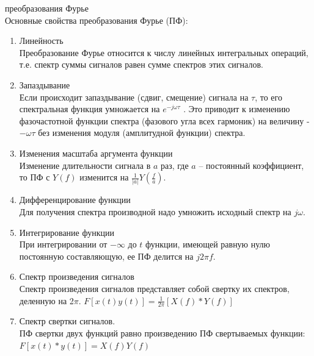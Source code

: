 \documentclass[a4paper,12pt]{article}
\begin{document}
{ преобразования Фурье}
\\Основные свойства преобразования Фурье (ПФ):
\begin{enumerate}
	\item Линейность\\
    Преобразование Фурье относится к числу линейных интегральных операций, т.е. спектр суммы сигналов равен сумме спектров этих сигналов.
    \item Запаздывание\\
   Если происходит запаздывание (сдвиг, смещение) сигнала на $\tau$, то его спектральная функция умножается на $e^{-j\omega \tau}$ . Это приводит к изменению фазочастотной функции спектра (фазового угла всех гармоник) на величину - $-\omega \tau$ без изменения модуля (амплитудной функции) спектра.
    \item Изменения масштаба аргумента функции\\
   Изменение длительности сигнала в $a$ раз, где $a$ -- постоянный коэффициент, то ПФ с $Y(f)$ изменится на $\frac{1}{|a|}Y(\frac{f}{a})$.
    \item Дифференцирование функции\\
    Для получения спектра производной надо умножить исходный спектр на $j \omega$.
     \item Интегрирование функции\\
    При интегрировании от $-{\infty}$ до $t$ функции, имеющей равную нулю постоянную составляющую, ее ПФ делится на $j2{\pi}f$.
    \item Спектр произведения сигналов\\
    Спектр произведения сигналов представляет собой свертку их спектров, деленную на 2$\pi$.
    $F[x(t)y(t)]={\frac{1}{2{\pi}}}[X(f)*Y(f)]$
    \item Спектр свертки сигналов.\\
    ПФ свертки двух функций равно произведению ПФ свертываемых функции: $F[x(t)*y(t)]=X(f)Y(f)$
\end{enumerate}
\end{document}

